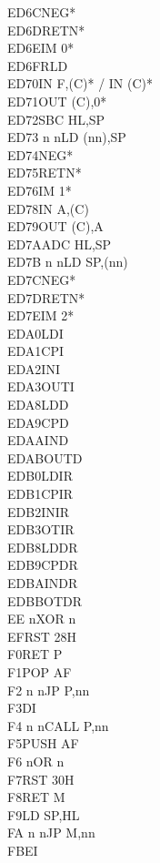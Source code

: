 \documentclass[oneside,a4paper]{book}
\begin{document}
\begin{multicols}{3}
{\begin{tabbing}
ED6C\>NEG*\\
ED6D\>RETN*\\
ED6E\>IM 0*\\
ED6F\>RLD\\
ED70\>IN F,(C)* / IN (C)*\\
ED71\>OUT (C),0*\\
ED72\>SBC HL,SP\\
ED73 n n\>LD (nn),SP\\
ED74\>NEG*\\
ED75\>RETN*\\
ED76\>IM 1*\\
ED78\>IN A,(C)\\
ED79\>OUT (C),A\\
ED7A\>ADC HL,SP\\
ED7B n n\>LD SP,(nn)\\
ED7C\>NEG*\\
ED7D\>RETN*\\
ED7E\>IM 2*\\
EDA0\>LDI\\
EDA1\>CPI\\
EDA2\>INI\\
EDA3\>OUTI\\
EDA8\>LDD\\
EDA9\>CPD\\
EDAA\>IND\\
EDAB\>OUTD\\
EDB0\>LDIR\\
EDB1\>CPIR\\
EDB2\>INIR\\
EDB3\>OTIR\\
EDB8\>LDDR\\
EDB9\>CPDR\\
EDBA\>INDR\\
EDBB\>OTDR\\
EE n\>XOR n\\
EF\>RST 28H\\
F0\>RET P\\
F1\>POP AF\\
F2 n n\>JP P,nn\\
F3\>DI\\
F4 n n\>CALL P,nn\\
F5\>PUSH AF\\
F6 n\>OR n\\
F7\>RST 30H\\
F8\>RET M\\
F9\>LD SP,HL\\
FA n n\>JP M,nn\\
FB\>EI\\

\end{tabbing}}
\end{multicols}
\end{document}
